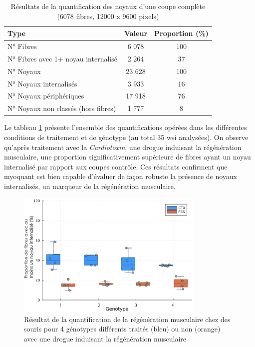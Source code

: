 \begin{table}[!ht]
\centering
\caption{Résultats de la quantification des noyaux d'une coupe complète (6078 fibres, 12000 x 9600 pixels)}
\label{tab:myoquant_fluo_results}
\begin{tabular}{|l|c|c|}
\hline
\textbf{Type} & \textbf{Valeur} & \textbf{Proportion (\%)} \\
\hline
N° Fibres & 6 078 & 100 \\
\hline
N° Fibres avec 1+ noyau internalisé & 2 264 & 37 \\
\hline
\hline
N° Noyaux & 23 628 & 100 \\
\hline
N° Noyaux internalisés & 3 933 & 16 \\
\hline
N° Noyaux périphériques & 17 918 & 76 \\
\hline
N° Noyaux non classés (hors fibres) & 1 777 & 8 \\
\hline
\end{tabular}
\end{table}
Le tableau \ref{fig:fluo_compil} présente l'ensemble des quantifications opérées dans les différentes conditions de traitement et de génotype (au total 35 \gls{wsi} analysées). On observe qu'après traitement avec la \textit{Cardiotoxin}, une drogue induisant la régénération musculaire, une proportion significativement supérieure de fibres ayant un noyau internalisé par rapport aux coupes contrôle. Ces résultats confirment que \gls{myoquant} est bien capable d'évaluer de façon robuste la présence de noyaux internalisés, un marqueur de la régénération musculaire.

\begin{figure}[!ht]
 \centering
 \includegraphics[width=0.8\textwidth]{figures/fluo_compil.png}
 \caption[Résultat de la quantification de la régénération musculaire]{Résultat de la quantification de la régénération musculaire chez des souris pour 4 génotypes différents traités (bleu) ou non (orange) avec une drogue induisant la régénération musculaire}
 \label{fig:fluo_compil}
\end{figure}

